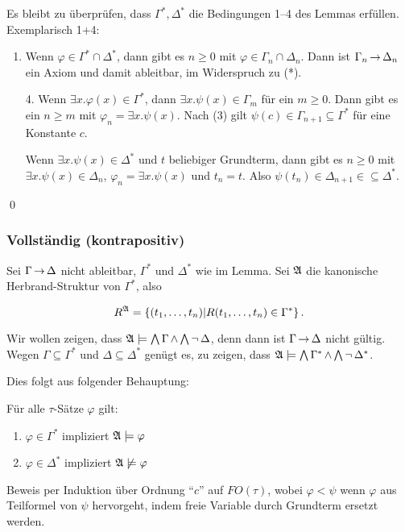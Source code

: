 Es bleibt zu überprüfen, dass $\Gamma^*,\Delta^*$ die Bedingungen 1--4
des Lemmas erfüllen. Exemplarisch 1+4:

\begin{enumerate}
  \item Wenn $\varphi\in\Gamma^*\cap\Delta^*$, dann gibt es $n\geq 0$ mit
  $\varphi\in\Gamma_n\cap\Delta_n$. Dann ist $\Gamma_n\operatorname{\rightarrow}\Delta_n$ ein
  Axiom und damit ableitbar, im Widerspruch zu (*).
  
  \item[4.] Wenn $\exists x.\varphi(x)\in\Gamma^*$, dann
  $\exists x.\psi(x)\in\Gamma_m$ für ein $m\geq 0$. Dann gibt es ein
  $n\geq m$ mit $\varphi_n=\exists x.\psi(x)$. Nach (3) gilt
  $\psi(c)\in\Gamma_{n+1}\subseteq\Gamma^*$ für eine Konstante $c$.
  
  Wenn $\exists x.\psi(x)\in\Delta^*$ und $t$ beliebiger Grundterm, dann
  gibt es $n\geq 0$ mit $\exists x.\psi(x)\in\Delta_n$,
  $\varphi_n=\exists x.\psi(x)$ und $t_n=t$. Also
  $\psi(t_n)\in\Delta_{n+1}\in\subseteq\Delta^*$.
\end{enumerate}
\qed

\subsubsection{Vollständig (kontrapositiv)}

Sei $\Gamma\operatorname{\rightarrow}\Delta$ nicht ableitbar, $\Gamma^*$ und $\Delta^*$ wie
im Lemma. Sei $\mathfrak{A}$ die kanonische Herbrand-Struktur von $\Gamma^*$,
also

\[
  R^{\mathfrak{A}} = \left\{(t_1,\dots,t_n) | R(t_1,\dots,t_n)\in\Gamma^*\right\}.
\]

Wir wollen zeigen, dass $\mathfrak{A}\models\operatorname*{\bigwedge}\Gamma \operatorname{\wedge} \operatorname*{\bigwedge}\operatorname{\neg}\Delta$,
denn dann ist $\Gamma\operatorname{\rightarrow}\Delta$ nicht gültig. Wegen $\Gamma\subseteq\Gamma^*$
und $\Delta\subseteq\Delta^*$ genügt es, zu zeigen, dass
$\mathfrak{A}\models\operatorname*{\bigwedge}\Gamma^* \operatorname{\wedge} \operatorname*{\bigwedge} \operatorname{\neg}\Delta^*$.

Dies folgt aus folgender Behauptung:

Für alle $\tau$-Sätze $\varphi$ gilt:

\begin{enumerate}
  \item $\varphi\in\Gamma^*$ impliziert $\mathfrak{A}\models\varphi$
  \item $\varphi\in\Delta^*$ impliziert $\mathfrak{A}\not\models\varphi$
\end{enumerate}
  
Beweis per Induktion über Ordnung \enquote{$c$} auf $FO(\tau)$, wobei
$\varphi<\psi$ wenn $\varphi$ aus Teilformel von $\psi$ hervorgeht, indem
freie Variable durch Grundterm ersetzt werden.

